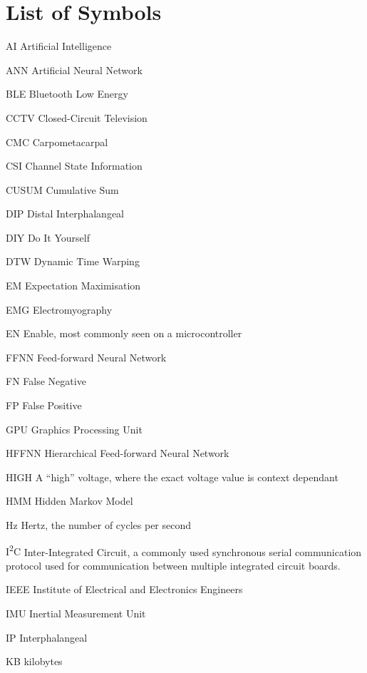 \chapter{List of Symbols}
\label{chap:symbols}

\begin{Nomencl}[1cm]
    \item[AI] Artificial Intelligence
    \item[ANN] Artificial Neural Network
    \item[BLE] Bluetooth Low Energy
    \item[CCTV] Closed-Circuit Television
    \item[CMC] Carpometacarpal
    \item[CSI] Channel State Information
    \item[CUSUM] Cumulative Sum
    \item[DIP] Distal Interphalangeal
    \item[DIY] Do It Yourself
    \item[DTW] Dynamic Time Warping
    \item[EM] Expectation Maximisation
    \item[EMG] Electromyography
    \item[EN] Enable, most commonly seen on a microcontroller
    \item[FFNN] Feed-forward Neural Network
    \item[FN] False Negative
    \item[FP] False Positive
    \item[GPU] Graphics Processing Unit
    \item[HFFNN] Hierarchical Feed-forward Neural Network
    \item[HIGH] A ``high'' voltage, where the exact voltage value is context dependant
    \item[HMM] Hidden Markov Model
    \item[Hz] Hertz, the number of cycles per second
    \item[I\textsuperscript{2}C] Inter-Integrated Circuit, a commonly used
        synchronous serial communication protocol used for communication
        between multiple integrated circuit boards.
    \item[IEEE] Institute of Electrical and Electronics Engineers
    \item[IMU] Inertial Measurement Unit
    \item[IP] Interphalangeal
    \item[KB] kilobytes

\end{Nomencl}
